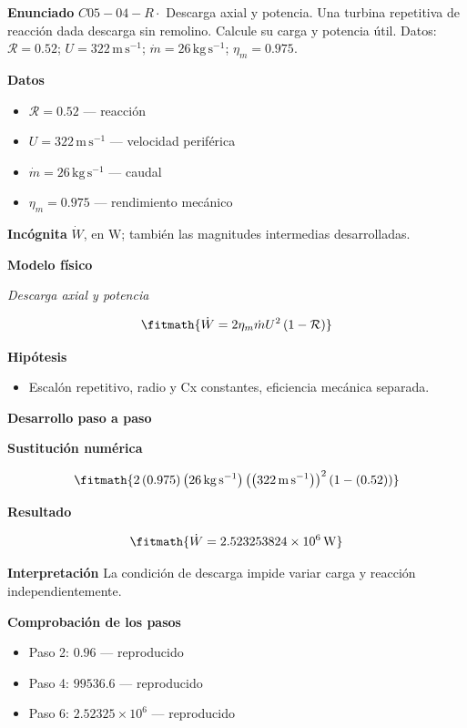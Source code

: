 \documentclass[10pt,openany]{book}
\begin{document}
\begin{tcolorbox}[title={Problema resuelto 4}, studiumworked, breakable]

\noindent\textbf{Enunciado}
\(C05-04-R \cdot\) Descarga axial y potencia. Una turbina repetitiva de reacción dada descarga sin remolino. Calcule su carga y potencia útil. Datos: \(\mathcal R=0.52\); \(U=322\, \mathrm{m}\,\mathrm{s}^{-1}\); \(\dot m=26\, \mathrm{kg}\,\mathrm{s}^{-1}\); \(\eta_m=0.975\).

\noindent\textbf{Datos}
\begin{itemize}
\item $\mathcal R = 0.52$ — reacción
\item $U = 322\,\mathrm{m}\,\mathrm{s}^{-1}$ — velocidad periférica
\item $\dot m = 26\,\mathrm{kg}\,\mathrm{s}^{-1}$ — caudal
\item $\eta_m = 0.975$ — rendimiento mecánico
\end{itemize}

\noindent\textbf{Incógnita}
$\dot{W}$, en $\mathrm{W}$; también las magnitudes intermedias desarrolladas.

\noindent\textbf{Modelo físico}

\noindent\textit{Descarga axial y potencia}

\[
\fitmath{\dot{W}=2 \eta_m \dot m U^{2} \left(1 - \mathcal R\right)}
\]

\noindent\textbf{Hipótesis}
\begin{itemize}
\item Escalón repetitivo, radio y Cx constantes, eficiencia mecánica separada.
\end{itemize}

\noindent\textbf{Desarrollo paso a paso}



\noindent\textbf{Sustitución numérica}

\[
\fitmath{2 \left(0.975\right) \left(26\,\mathrm{kg}\,\mathrm{s}^{-1}\right) \left(\left(322\,\mathrm{m}\,\mathrm{s}^{-1}\right)\right)^{2} \left(1 - \left(0.52\right)\right)}
\]

\noindent\textbf{Resultado}

\[
\fitmath{\dot{W}=2.523253824\times10^{6}\,\mathrm{W}}
\]

\noindent\textbf{Interpretación}
La condición de descarga impide variar carga y reacción independientemente.

\noindent\textbf{Comprobación de los pasos}
\begin{itemize}
\item Paso 2: $0.96$ — reproducido
\item Paso 4: $99536.6$ — reproducido
\item Paso 6: $2.52325\times 10^{6}$ — reproducido
\end{itemize}


\end{tcolorbox}
\end{document}
